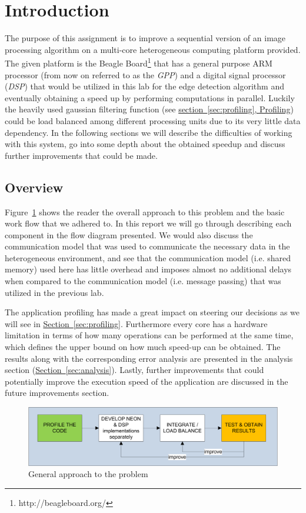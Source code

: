 \section{Introduction}

The purpose of this assignment is to improve a sequential version of an image processing algorithm on a multi-core heterogeneous computing platform provided. The given platform is the Beagle Board\footnote{http://beagleboard.org/} that has a general purpose ARM processor (from now on referred to as the \emph{GPP}) and a digital signal processor (\emph{DSP}) that would be utilized in this lab for the edge detection algorithm and eventually obtaining a speed up by performing computations in parallel. Luckily the heavily used gaussian filtering function (see \hyperref[sec:profiling]{section~\ref{sec:profiling}, Profiling}) could be load balanced among different processing units due to its very little data dependency. In the following sections we will describe the difficulties of working with this system, go into some depth about the obtained speedup and discuss further improvements that could be made.

\subsection{Overview}
Figure~\ref{fig:workflow} shows the reader the overall approach to this problem and the basic work flow that we adhered to. In this report we will go through describing each component in the flow diagram presented. We would also discuss the communication model that was used to communicate the necessary data in the heterogeneous environment, and see that the communication model (i.e. shared memory) used here has little overhead and imposes almost no additional delays when compared to the communication model (i.e. message passing) that was utilized in the previous lab.

The application profiling has made a great impact on steering our decisions as we will see in \hyperref[sec:profiling]{Section~\ref{sec:profiling}}. Furthermore every core has a hardware limitation in terms of how many operations can be performed at the same time, which defines the upper bound on how much speed-up can be obtained. The results along with the corresponding error analysis are presented in the analysis section (\hyperref[sec:analysis]{Section~\ref{sec:analysis}}). Lastly, further improvements that could potentially improve the execution speed of the application are discussed in the future improvements section.

\begin{figure}
\includegraphics[width=\linewidth]{drawings/workflow}
\caption{General approach to the problem}
\label{fig:workflow}
\end{figure}


